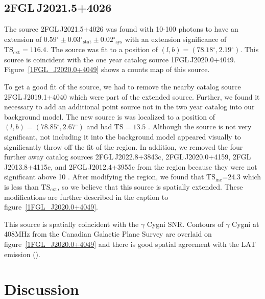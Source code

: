 \documentclass[12pt,preprint]{aastex}
\newcommand{\gev}{\text{GeV}\xspace}
\newcommand{\tsext}{{\ensuremath{\text{TS}_{\text{ext}}}}\xspace}
\newcommand{\tsinc}{\ensuremath{\text{TS}_{\text{inc}}}\xspace}
\newcommand{\ts}{\text{TS}\xspace}
\newcommand{\sys}{\text{sys}\xspace}
\newcommand{\stat}{\text{stat}\xspace}
\renewcommand{\deg}{\ensuremath{^\circ}\xspace}
\begin{document}
\subsection{2FGL\,J2021.5+4026}
\label{section_2FGL J2021.5+4026}



The source 2FGL\,J2021.5+4026 was found with 10-100 \gev
photons to have an extension of $0.59\deg\pm0.03\deg_\stat\pm0.02\deg_\sys$
with an extension significance of $\tsext=116.4$.  The source was
fit to a position of $(l,b)=(78.18\deg,2.19\deg)$.  This source
is coincident with the one year catalog source 1FGL\,J2020.0+4049.
Figure~\ref{1FGL_J2020.0+4049} shows a counts map of this source.

To get a good fit of the source, we had to remove the nearby catalog
source 2FGL\,J2019.1+4040 which were part of the extended source.
Further, we found it necessary to add an additional point source not in
the two year catalog into our background model.  The new source is was
localized to a position of $(l,b)=(78.85\deg,2.67\deg)$ and had $\ts=13.5$ .
Although the source is not very significant, not including it into the
background model appeared visually to significantly throw off the fit
of the region.  In addition, we removed the four further away catalog
sources 2FGL\,J2022.8+3843c, 2FGL\,J2020.0+4159, 2FGL\,J2013.8+4115c,
and 2FGL\,J2012.4+3955c from the region because they were not significant
above 10 \gev.  After modifying the region, we found that \tsinc=24.3
which is less than \tsext, so we believe that this source is spatially
extended.  These modifications are further described in the caption to
figure~\ref{1FGL_J2020.0+4049}.

This source is spatially coincident with the $\gamma$ Cygni SNR.  Contours of
$\gamma$ Cygni at 408MHz from the Canadian Galactic Plane Survey are overlaid
on figure~\ref{1FGL_J2020.0+4049} and there is good spatial agreement
with the LAT emission (\cite{canadian_galactic_plane_survey}).


\section{Discussion}
\end{document}
